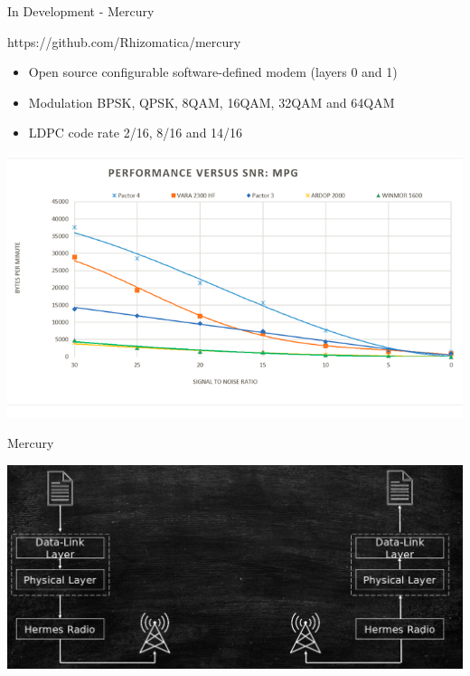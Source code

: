 \documentclass[aspectratio=169,xcolor={x11names,svgnames,dvipsnames}]{beamer}
\begin{document}
\begin{frame}{In Development - Mercury}

\begin{block}{https://github.com/Rhizomatica/mercury}
    \begin{itemize}
    \item Open source configurable software-defined modem (layers 0 and 1)
    \item Modulation BPSK, QPSK, 8QAM, 16QAM, 32QAM and 64QAM
    \item LDPC code rate 2/16, 8/16 and 14/16
    \end{itemize}
  \end{block}

  \begin{center}
    \includegraphics[width=.55\columnwidth]{image_modems.png}
  \end{center}

\end{frame}


\begin{frame}{Mercury}

  \begin{center}
    \includegraphics[width=.95\columnwidth]{mercury1.jpg}
  \end{center}

\end{frame}
\end{document}
